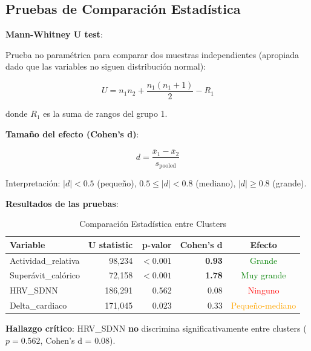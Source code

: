 \documentclass[12pt,letterpaper,twoside]{report}
\begin{document}
\begin{calculobox}
\subsection{Pruebas de Comparación Estadística}

\begin{estadisticobox}
\textbf{Mann-Whitney U test}:

Prueba no paramétrica para comparar dos muestras independientes (apropiada dado que las variables no siguen distribución normal):

\begin{equation}
U = n_1 n_2 + \frac{n_1(n_1+1)}{2} - R_1
\end{equation}

donde $R_1$ es la suma de rangos del grupo 1.

\textbf{Tamaño del efecto (Cohen's d)}:

\begin{equation}
d = \frac{\bar{x}_1 - \bar{x}_2}{s_{\text{pooled}}}
\end{equation}

Interpretación: $|d| < 0.5$ (pequeño), $0.5 \leq |d| < 0.8$ (mediano), $|d| \geq 0.8$ (grande).
\end{estadisticobox}

\begin{calculobox}
\textbf{Resultados de las pruebas}:

\begin{table}[H]
\centering
\caption{Comparación Estadística entre Clusters}
\label{tab:cluster_comparison}
\begin{tabular}{@{}lrrrc@{}}
\toprule
\textbf{Variable} & \textbf{U statistic} & \textbf{p-valor} & \textbf{Cohen's d} & \textbf{Efecto} \\
\midrule
Actividad\_relativa     & 98,234  & $< 0.001$ & \textbf{0.93} & \textcolor{green}{Grande} \\
Superávit\_calórico     & 72,158  & $< 0.001$ & \textbf{1.78} & \textcolor{green}{Muy grande} \\
HRV\_SDNN               & 186,291 & 0.562     & 0.08 & \textcolor{red}{Ninguno} \\
Delta\_cardiaco         & 171,045 & 0.023     & 0.33 & \textcolor{orange}{Pequeño-mediano} \\
\bottomrule
\end{tabular}
\end{table}

\textbf{Hallazgo crítico}: HRV\_SDNN \textbf{no} discrimina significativamente entre clusters ($p=0.562$, Cohen's d = 0.08).
\end{calculobox}


\end{calculobox}
\end{document}
